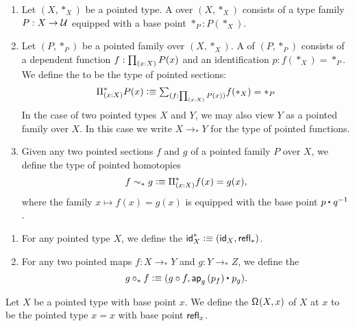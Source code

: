 \begin{defn}
\begin{enumerate}
\item Let $(X,\ast_X)$ be a pointed type. A  over $(X,\ast_X)$ consists of a type family $P:X\to \UU$ equipped with a base point $\ast_P:P(\ast_X)$. 
\item Let $(P,\ast_P)$ be a pointed family over $(X,\ast_X)$. A  of $(P,\ast_P)$ consists of a dependent function $f:\prd{x:X}P(x)$ and an identification $p:f(\ast_X)=\ast_P$. We define the  to be the type of pointed sections:
\begin{equation*}
\Pi^\ast_{(x:X)}P(x) \defeq \sm{f:\prd{x:X}P(x)}f(\ast_X)=\ast_P
\end{equation*}
In the case of two pointed types $X$ and $Y$, we may also view $Y$ as a pointed family over $X$. In this case we write $X\to_\ast Y$ for the type of pointed functions.
\item Given any two pointed sections $f$ and $g$ of a pointed family $P$ over $X$, we define the type of pointed homotopies
\begin{equation*}
f\htpy_\ast g \defeq \Pi^\ast_{(x:X)} f(x)=g(x),
\end{equation*}
where the family $x\mapsto f(x)=g(x)$ is equipped with the base point $\ct{p}{q^{-1}}$. 
\end{enumerate}
\end{defn}

\begin{defn}
\begin{enumerate}
\item For any pointed type $X$, we define the  $\mathsf{id}^\ast_X\defeq (\idfunc[X],\refl{\ast})$. 
\item For any two pointed maps $f:X\to_\ast Y$ and $g:Y\to_\ast Z$, we define the 
\begin{equation*}
g\mathbin{\circ_\ast} f \defeq (g\circ f,\ct{\ap{g}{p_f}}{p_g}).
\end{equation*}
\end{enumerate}
\end{defn}

\begin{defn}
Let $X$ be a pointed type with base point $x$. We define the  $\loopspace{X,x}$ of $X$ at $x$ to be the pointed type $x=x$ with base point $\refl{x}$. 
\end{defn}


